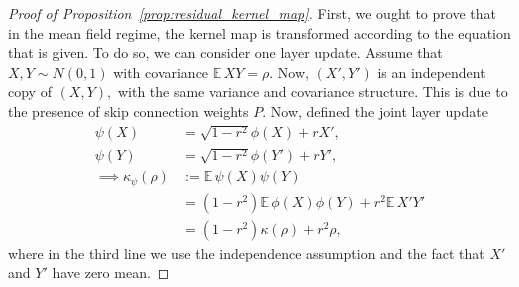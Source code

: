 \documentclass[twoside]{article}
\newcommand{\E}{\mathbb{E}\,}
\theoremstyle{definition}
\begin{document}
\begin{proof}[Proof of Proposition~\ref{prop:residual_kernel_map}]
First, we ought to prove that in the mean field regime, the kernel map is transformed according to the equation that is given. To do so, we can consider one layer update. Assume that $X,Y\sim N(0,1)$ with covariance $\E XY = \rho.$ Now, $(X',Y')$ is an independent copy of $(X,Y),$ with the same variance and covariance structure. This is due to the presence of skip connection weights $P.$ Now, defined the joint layer update 
\begin{align*}
\psi(X) &= \sqrt{1-r^2} \phi(X)  + r X',\\
\psi(Y) &= \sqrt{1-r^2} \phi(Y')  + r Y',\\
\implies \kappa_\psi(\rho)&:= \E \psi(X)\psi(Y) \\
&=  (1-r^2) \E \phi(X)\phi(Y) + r^2 \E X' Y' \\
    &= (1-r^2) \kappa(\rho) + r^2 \rho,
\end{align*}
where in the third line we use the independence assumption and the fact that $X'$ and $Y'$ have zero mean. 


\end{proof}
\end{document}
